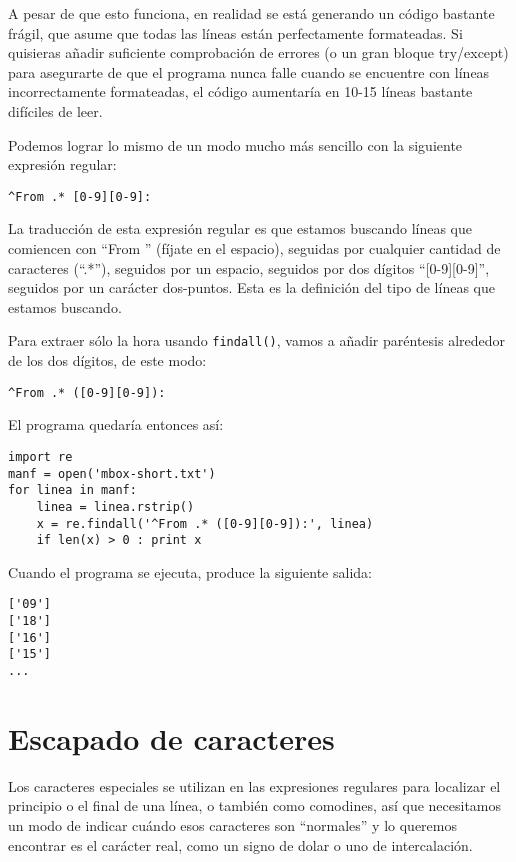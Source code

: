 A pesar de que esto funciona, en realidad se está generando un código bastante frágil, que asume que todas las líneas
están perfectamente formateadas. Si quisieras añadir suficiente comprobación de errores (o un gran bloque try/except)
para asegurarte de que el programa nunca falle cuando se encuentre con líneas incorrectamente formateadas,
el código aumentaría en 10-15 líneas bastante difíciles de leer.

Podemos lograr lo mismo de un modo mucho más sencillo con la siguiente expresión regular:

\beforeverb
\begin{verbatim}
^From .* [0-9][0-9]:
\end{verbatim}
\afterverb
%
La traducción de esta expresión regular es que estamos buscando líneas que comiencen con ``From ''
(fíjate en el espacio), seguidas por cualquier cantidad de caracteres (``.*''), seguidos por un espacio,
seguidos por dos dígitos ``[0-9][0-9]'', seguidos por un carácter dos-puntos. Esta es la definición del tipo de
líneas que estamos buscando.

Para extraer sólo la hora usando {\tt findall()}, vamos a añadir paréntesis alrededor de los dos dígitos,
de este modo:

\beforeverb
\begin{verbatim}
^From .* ([0-9][0-9]):
\end{verbatim}
\afterverb
%
El programa quedaría entonces así:

\beforeverb
\begin{verbatim}
import re
manf = open('mbox-short.txt')
for linea in manf:
    linea = linea.rstrip()
    x = re.findall('^From .* ([0-9][0-9]):', linea)
    if len(x) > 0 : print x
\end{verbatim}
\afterverb
%
Cuando el programa se ejecuta, produce la siguiente salida:

\beforeverb
\begin{verbatim}
['09']
['18']
['16']
['15']
...
\end{verbatim}
\afterverb
%
\section{Escapado de caracteres}

Los caracteres especiales se utilizan en las expresiones regulares para localizar el principio o el final
de una línea, o también como comodines, así que necesitamos un modo de indicar cuándo esos caracteres son
``normales'' y lo queremos encontrar es el carácter real, como un signo de dolar o uno de intercalación.

